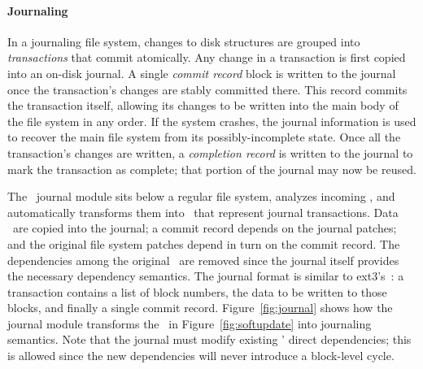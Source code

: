 
\paragraph{Journaling}
\label{sec:using:journal}

In a journaling file system, changes to disk structures are grouped into
\emph{transactions} that commit atomically.
%
Any change in a transaction is first copied into an on-disk journal.
%
A single \emph{commit record} block is written to the journal once the
transaction's changes are stably committed there.
%
This record commits the transaction itself, allowing its changes to be
written into the main body of the file system in any order.
%
If the system crashes, the journal information is used to recover the main
file system from its possibly-incomplete state.
%
Once all the transaction's changes are written, a \emph{completion record}
is written to the journal to mark the transaction as complete; that portion
of the journal may now be reused.

\begin{comment}
the journal point the transaction itself has the commit record
has been written, the changes (which collectively are called a
\emph{transaction}) are considered to have been made to the file system: if
the system crashes, the data from the journal will be copied into the main
file system as part of recovery. After the commit record has been written,
the original changes may be written in any order desired, and once they
have been written, the commit record may be erased and the portion of the
journal storing the data it referenced can be reused.
\end{comment}

The \Kudos\ journal module sits below a regular file system, analyzes
incoming \patches, and automatically transforms them into \patches\ that
represent journal transactions.
%
Data \patches\ are copied into the journal; a commit record depends on the
journal patches; and the original file system patches depend in turn on the
commit record.
%
The dependencies among the original \patches\ are removed since the journal
itself provides the necessary dependency semantics.
%
The journal format is similar to ext3's~\cite{tweedie98journaling}: a
transaction contains a list of block numbers, the data to be written to
those blocks, and finally a single commit record.
%
Figure~\ref{fig:journal} shows how the journal module transforms the
\patches\ in Figure~\ref{fig:softupdate} into journaling semantics.
%
Note that the journal must modify existing \patches' direct dependencies;
this is allowed since the new dependencies will never introduce a
block-level cycle.

